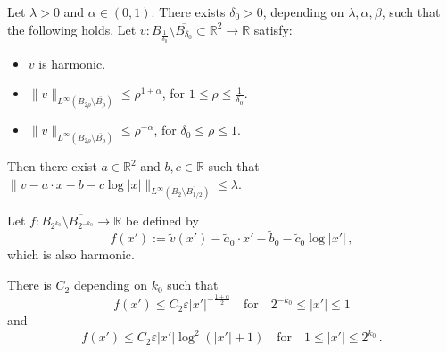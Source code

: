 \documentclass[10pt,a4paper]{amsart}
\newcommand{\R}{\mathbb{R}}
\newcommand{\ep}{\varepsilon}
\begin{document}
\begin{lemma}\label{lincomp2D} Let $\lambda>0$ and $\alpha \in (0,1)$. There exists $\delta_0>0$, depending on $\lambda, \alpha, \beta$, such that the following holds. Let $v:B_{\frac{1}{\delta_0}}\setminus \overline{B_{\delta_0}}\subset \R^2 \to \R$ satisfy:
\begin{itemize}
    \item $v$ is harmonic.
    
    \item $\|v\|_{L^\infty(B_{2\rho}\setminus \overline{B_\rho})}\leq \rho^{1+\alpha}$, for $1\leq\rho\leq\frac{1}{\delta_0}$.
    
    \item $\|v\|_{L^\infty(B_{2\rho}\setminus \overline{B_\rho})}\leq \rho^{-\alpha}$, for $\delta_0\leq\rho\leq 1$.
\end{itemize}
Then there exist $a\in\R^{2}$ and $b,c\in\R$ such that $\|v-a\cdot x-b-c\log |x|\|_{L^\infty(B_{2}\setminus \overline{B_{1/2}})
}\leq \lambda$.
\end{lemma}

\begin{lemma}\label{lem:grphregnHypB}
    Let $f:B_{2^{k_0}}\setminus \overline{B_{2^{-k_0}}}\to\R$ be defined by
    \begin{equation}\label{eq:894tibhabHypB}
        f(x'):=\widetilde v (x')-\widetilde a_0\cdot x'-\widetilde b_0-\widetilde c_0\log|x'|\,,
    \end{equation}
    which is also harmonic.

    There is $C_2$ depending on $k_0$ such that
\begin{equation}\label{eq:1278tq3gq}
    f(x')\leq C_2\ep|x'|^{-\frac{1+\alpha}{2}}\quad\mbox{for}\quad 2^{-k_0}\leq|x'|\leq 1
\end{equation}
and
\begin{equation}\label{eq:1278tq3gq2}
    f(x')\leq C_2\ep|x'|\log^2(|x'|+1)\quad\mbox{for}\quad 1\leq|x'|\leq 2^{k_0}\,.
\end{equation}
\end{lemma}
\end{document}
